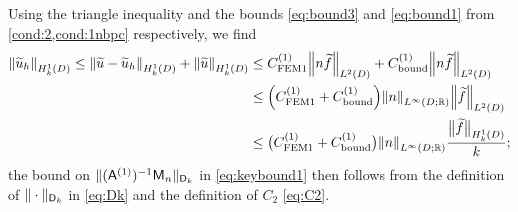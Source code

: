 
Using %
the triangle inequality and the bounds \cref{eq:bound3} and \cref{eq:bound1} from \cref{cond:2,cond:1nbpc} respectively, we find
\begin{align}
\N{\tu_h}_{\HokD} \leq
\N{\tu-\tu_h}_{\HokD} + \N{\tu}_{\HokD} \label{eq:mainevent1}
& \leq C^{(1)}_{\rm FEM1}\NLtD{n\ftilde} + C^{(1)}_{\rm bound}\NLtD{n\ftilde} \\ 
& \leq \mleft(C^{(1)}_{\rm FEM1} + C^{(1)}_{\rm bound}\mright)\NLiDRR{n}\NLtD{\ftilde} \label{eq:mainevent1a} \\
& \leq\big(C^{(1)}_{\rm FEM1}+  C^{(1)}_{\rm bound}\big)\NLiDRR{n}\frac{\big\|\widetilde{f}\big\|_{\HokD}}{k};\nonumber
\end{align}
the bound on $\|(\mathsf{A}^{(1)})^{-1}\mathsf{M}_n\|_{\mathsf{D}_k}$ in \cref{eq:keybound1} then follows from the definition of $\|\cdot\|_{\mathsf{D}_k}$ in \cref{eq:Dk} and the definition of $C_2$ \cref{eq:C2}.

